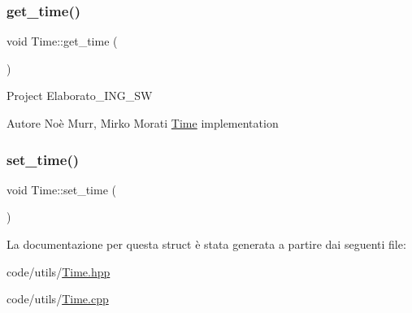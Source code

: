 \subsubsection{\texorpdfstring{get\+\_\+time()}{get\_time()}}
{\footnotesize\ttfamily void Time\+::get\+\_\+time (\begin{DoxyParamCaption}{ }\end{DoxyParamCaption})}

Project Elaborato\+\_\+\+I\+N\+G\+\_\+\+SW \begin{DoxyAuthor}{Autore}
Noè Murr, Mirko Morati \hyperlink{struct_time}{Time} implementation 
\end{DoxyAuthor}
\mbox{\label{struct_time_a76fe3565c8497fe80720123aa0b988fb}} 
\subsubsection{\texorpdfstring{set\+\_\+time()}{set\_time()}}
{\footnotesize\ttfamily void Time\+::set\+\_\+time (\begin{DoxyParamCaption}{ }\end{DoxyParamCaption})}



La documentazione per questa struct è stata generata a partire dai seguenti file\+:\begin{DoxyCompactItemize}
\item 
code/utils/\hyperlink{_time_8hpp}{Time.\+hpp}\item 
code/utils/\hyperlink{_time_8cpp}{Time.\+cpp}\end{DoxyCompactItemize}
